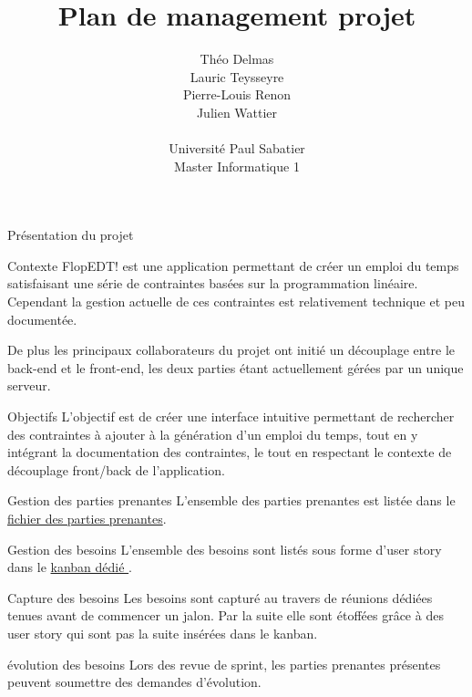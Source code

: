 \documentclass[]{article}
\title{Plan de management projet}
\author{
    Théo Delmas\\
    Lauric Teysseyre\\
    Pierre-Louis Renon\\
    Julien Wattier\\
    \\
    Université Paul Sabatier\\
    Master Informatique 1\\
   }
\date{}
\begin{document}
\maketitle
\newpage
\tableofcontents
\newpage

\begin{section}{Présentation du projet}
    \begin{subsection}{Contexte}
        FlopEDT! est une application permettant de créer un emploi du temps satisfaisant une série de contraintes basées sur 
        la programmation linéaire. Cependant la gestion actuelle de ces contraintes est relativement technique et peu documentée.

        De plus les principaux collaborateurs du projet ont initié un découplage entre le back-end et le front-end, les deux parties étant actuellement gérées par un unique serveur.
    \end{subsection}

    \begin{subsection}{Objectifs}
        L’objectif est de créer une interface intuitive permettant de rechercher des contraintes à ajouter à la génération 
        d’un emploi du temps, tout en y intégrant la documentation des contraintes, le tout en respectant le contexte de découplage front/back de l'application.
    \end{subsection}
\end{section}

\begin{section}{Gestion des parties prenantes}
 L'ensemble des parties prenantes est listée dans le \href{../Parties_prenantes/Parties_prenantes.pdf}{fichier des parties prenantes}.

\end{section}

\begin{section}{Gestion des besoins}
 L'ensemble des besoins sont listés sous forme d'user story dans le \href{https://wekan.flopedt.org/b/HsRkBw5rbmQt5PQet/catalogue}{kanban dédié }.

 \begin{subsection}{Capture des besoins}
     Les besoins sont capturé au travers de réunions dédiées tenues avant de commencer un jalon.
     Par la suite elle sont étoffées grâce à des user story qui sont pas la suite insérées dans le kanban.
 \end{subsection}

 \begin{subsection}{évolution des besoins}
    Lors des revue de sprint, les parties prenantes présentes peuvent soumettre des demandes d'évolution.

 \end{subsection}

\end{section}
\end{document}
